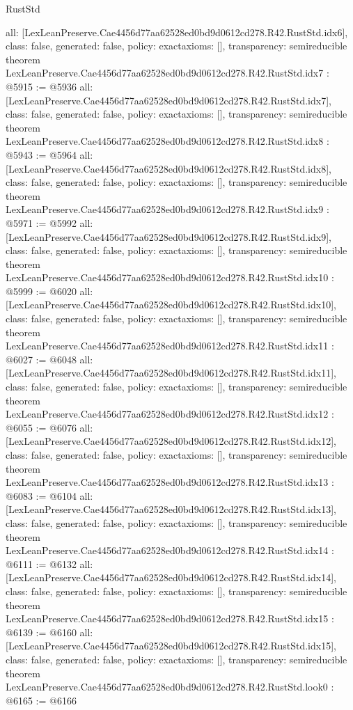 \begin{lexlean}{RustStd}
\begin{coremodule}
{  all: [LexLeanPreserve.Cae4456d77aa62528ed0bd9d0612cd278.R42.RustStd.idx6],
  class: false,
  generated: false,
  policy: exact{axioms: []},
  transparency: semireducible
}
theorem LexLeanPreserve.Cae4456d77aa62528ed0bd9d0612cd278.R42.RustStd.idx7 : @5915 := @5936 {
  all: [LexLeanPreserve.Cae4456d77aa62528ed0bd9d0612cd278.R42.RustStd.idx7],
  class: false,
  generated: false,
  policy: exact{axioms: []},
  transparency: semireducible
}
theorem LexLeanPreserve.Cae4456d77aa62528ed0bd9d0612cd278.R42.RustStd.idx8 : @5943 := @5964 {
  all: [LexLeanPreserve.Cae4456d77aa62528ed0bd9d0612cd278.R42.RustStd.idx8],
  class: false,
  generated: false,
  policy: exact{axioms: []},
  transparency: semireducible
}
theorem LexLeanPreserve.Cae4456d77aa62528ed0bd9d0612cd278.R42.RustStd.idx9 : @5971 := @5992 {
  all: [LexLeanPreserve.Cae4456d77aa62528ed0bd9d0612cd278.R42.RustStd.idx9],
  class: false,
  generated: false,
  policy: exact{axioms: []},
  transparency: semireducible
}
theorem LexLeanPreserve.Cae4456d77aa62528ed0bd9d0612cd278.R42.RustStd.idx10 : @5999 := @6020 {
  all: [LexLeanPreserve.Cae4456d77aa62528ed0bd9d0612cd278.R42.RustStd.idx10],
  class: false,
  generated: false,
  policy: exact{axioms: []},
  transparency: semireducible
}
theorem LexLeanPreserve.Cae4456d77aa62528ed0bd9d0612cd278.R42.RustStd.idx11 : @6027 := @6048 {
  all: [LexLeanPreserve.Cae4456d77aa62528ed0bd9d0612cd278.R42.RustStd.idx11],
  class: false,
  generated: false,
  policy: exact{axioms: []},
  transparency: semireducible
}
theorem LexLeanPreserve.Cae4456d77aa62528ed0bd9d0612cd278.R42.RustStd.idx12 : @6055 := @6076 {
  all: [LexLeanPreserve.Cae4456d77aa62528ed0bd9d0612cd278.R42.RustStd.idx12],
  class: false,
  generated: false,
  policy: exact{axioms: []},
  transparency: semireducible
}
theorem LexLeanPreserve.Cae4456d77aa62528ed0bd9d0612cd278.R42.RustStd.idx13 : @6083 := @6104 {
  all: [LexLeanPreserve.Cae4456d77aa62528ed0bd9d0612cd278.R42.RustStd.idx13],
  class: false,
  generated: false,
  policy: exact{axioms: []},
  transparency: semireducible
}
theorem LexLeanPreserve.Cae4456d77aa62528ed0bd9d0612cd278.R42.RustStd.idx14 : @6111 := @6132 {
  all: [LexLeanPreserve.Cae4456d77aa62528ed0bd9d0612cd278.R42.RustStd.idx14],
  class: false,
  generated: false,
  policy: exact{axioms: []},
  transparency: semireducible
}
theorem LexLeanPreserve.Cae4456d77aa62528ed0bd9d0612cd278.R42.RustStd.idx15 : @6139 := @6160 {
  all: [LexLeanPreserve.Cae4456d77aa62528ed0bd9d0612cd278.R42.RustStd.idx15],
  class: false,
  generated: false,
  policy: exact{axioms: []},
  transparency: semireducible
}
theorem LexLeanPreserve.Cae4456d77aa62528ed0bd9d0612cd278.R42.RustStd.look0 : @6165 := @6166 {
}
\end{coremodule}
\end{lexlean}
